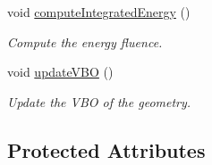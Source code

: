 \begin{DoxyCompactItemize}
void \hyperlink{classg_virtual_x_ray_1_1_x_ray_renderer_a117022f350fe6b0ab342edd804f44fb8}{computeIntegratedEnergy} ()
\begin{DoxyCompactList}\small\item\em Compute the energy fluence. \end{DoxyCompactList}\item 
void \hyperlink{classg_virtual_x_ray_1_1_x_ray_renderer_ae800750bd503f2e18251c266d8e528e3}{updateVBO} ()
\begin{DoxyCompactList}\small\item\em Update the VBO of the geometry. \end{DoxyCompactList}\end{DoxyCompactItemize}
\subsection*{Protected Attributes}
